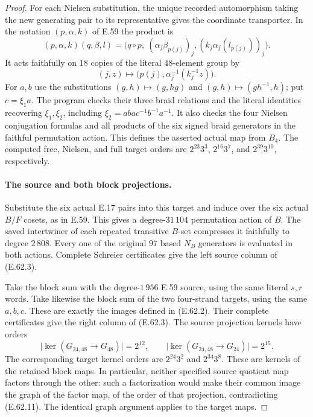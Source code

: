 \begin{proof}
For each Nielsen substitution, the unique recorded automorphism taking
the new generating pair to its representative gives the coordinate
transporter.  In the notation $(p,\alpha,k)$ of E.59 the product is
\[
 (p,\alpha,k)(q,\beta,l)=
 \bigl(q\circ p,\ (\alpha_j\beta_{p(j)})_j,
                 (k_j\alpha_j(l_{p(j)}))_j\bigr).
 \tag{E.62.9}
\]
It acts faithfully on $18$ copies of the literal $48$-element group by
\[
 (j,z)\longmapsto
 \bigl(p(j),\alpha_j^{-1}(k_j^{-1}z)\bigr).
 \tag{E.62.10}
\]
For $a,b$ use the substitutions
$(g,h)\mapsto(g,hg)$ and $(g,h)\mapsto(gh^{-1},h)$; put $c=\xi_1a$.
The program checks their three braid relations and the literal identities
recovering $\xi_1,\xi_2$, including
$\xi_2=abac^{-1}b^{-1}a^{-1}$.  It also checks the four Nielsen
conjugation formulas and all products of the six signed braid generators
in the faithful permutation action.  This defines the asserted actual
map from $B_4$.  The computed free, Nielsen, and full target orders are
$2^{23}3^3$, $2^{16}3^7$, and $2^{39}3^{10}$, respectively.

\paragraph{The source and both block projections.}
Substitute the six actual E.17 pairs into this target and induce over the
six actual $B/F$ cosets, as in E.59.  This gives a degree-$31\,104$
permutation action of $B$.  The saved intertwiner of each repeated
transitive $B$-set compresses it faithfully to degree $2\,808$.
Every one of the original $97$ based $N_B$ generators is evaluated in
both actions.  Complete Schreier certificates give the left source
column of \textup{(E.62.3)}.

Take the block sum with the degree-$1\,956$ E.59 source, using the same
literal $s,r$ words.  Take likewise the block sum of the two four-strand
targets, using the same $a,b,c$.  These are exactly the images defined
in \textup{(E.62.2)}.  Their complete certificates give the right
column of \textup{(E.62.3)}.  The source projection kernels have orders
\[
 \bigl|\ker(G_{24,48}\to G_{48})\bigr|=2^{12},\qquad
 \bigl|\ker(G_{24,48}\to G_{24})\bigr|=2^{15}.
 \tag{E.62.11}
\]
The corresponding target kernel orders are $2^{24}3^2$ and $2^{34}3^8$.
These are kernels of the retained block maps.  In particular, neither
specified source quotient map factors through the other: such a
factorization would make their common image the graph of the factor map,
of the order of that projection, contradicting \textup{(E.62.11)}.
The identical graph argument applies to the target maps.


\end{proof}
